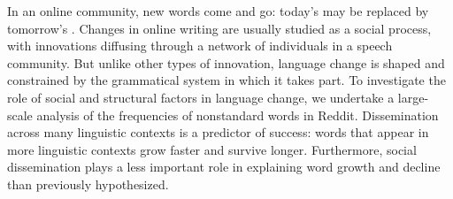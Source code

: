 In an online community, new words come and go: today's  may be replaced by tomorrow's . 
Changes in online writing are usually studied as a social process, with innovations diffusing through a network of individuals in a speech community.
But unlike other types of innovation, language change is shaped and constrained by the grammatical system in which it takes part.
To investigate the role of social and structural factors in language change, we undertake a large-scale analysis of the frequencies of nonstandard words in Reddit.
Dissemination across many linguistic contexts is a predictor of success: words that appear in more linguistic contexts grow faster and survive longer.
Furthermore, social dissemination plays a less important role in explaining word growth and decline than previously hypothesized.
